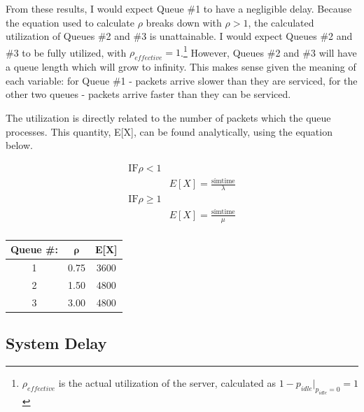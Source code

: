 \documentclass{article}
\begin{document}
From these results, I would expect Queue \#1 to have a negligible delay.  
Because the equation used to calculate $\rho$ breaks down with $\rho > 1$, the calculated utilization of Queues \#2 and \#3 is unattainable.  
I would expect Queues \#2 and \#3 to be fully utilized, with $\rho_{effective} = 1$.\footnote{$\rho_{effective}$ is the actual utilization of the server, calculated as $1-p_{idle}|_{p_{idle}=0}=1$}
However, Queues \#2 and \#3 will have a queue length which will grow to infinity.
This makes sense given the meaning of each variable:  for Queue \#1 - packets arrive slower than they are serviced, for the other two queues - packets arrive faster than they can be serviced.

The utilization is directly related to the number of packets which the queue processes. 
This quantity, E[X], can be found analytically, using the equation below.

\begin{minipage}{.5\textwidth}
\begin{align*}
\text{IF} \rho < 1 & \\
	& E[X] = \frac{\text{simtime}}{\lambda} \\
\text{IF} \rho \geq 1 & \\
	& E[X] = \frac{\text{simtime}}{\mu} \\
\end{align*}
\end{minipage}
\begin{minipage}{.5\textwidth}
\centering
\begin{tabular}{|c|c|c|} \hline
\textbf{Queue \#:} & $\mathbf{\rho}$ & \textbf{E[X]} \\ \hline
1 &  0.75 & 3600 \\ \hline
2 &  1.50 & 4800 \\ \hline
3 &  3.00 & 4800 \\ \hline
\end{tabular}
\label{ExpectUtilization}
\end{minipage}

\newpage
\subsection*{System Delay}
\end{document}
